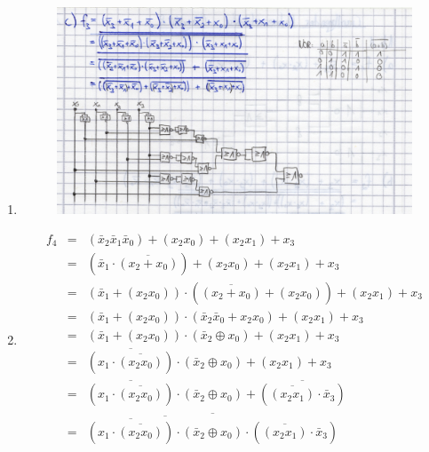 \documentclass[a4paper]{article}
\begin{document}
\begin{enumerate}[label=\alph*)]
\begin{figure}[h!]
\begin{center}
		\end{center}
	\end{figure} 
	\item 
	\begin{figure}[h!]
		\begin{center}
			\includegraphics[scale=0.3]{Aufgabe1c.png}
		\end{center}
	\end{figure} 
	\item 
	\begin{align*}
		f_4 &= &(\bar{x}_2 \bar{x}_1 \bar{x}_0) + (x_2x_0) + (x_2x_1) + x_3 \\
			&= &(\bar{x}_1 \cdot \overline{(x_2 + x_0)}) + (x_2x_0) + (x_2x_1) + x_3 \\
			&= &(\bar{x}_1 + (x_2x_0)) \cdot (\overline{(x_2 + x_0)} + (x_2x_0)) + (x_2x_1) + x_3 \\
			&= &(\bar{x}_1 + (x_2x_0)) \cdot (\bar{x}_2\bar{x}_0 + x_2x_0) + (x_2x_1) + x_3 \\
			&= &(\bar{x}_1 + (x_2x_0)) \cdot (\bar{x}_2 \oplus x_0) + (x_2x_1) + x_3 \\
			&= &\overline{(x_1 \cdot \overline{(x_2x_0)})} \cdot (\bar{x}_2 \oplus x_0) + (x_2x_1) + x_3 \\
			&= &\overline{(x_1 \cdot \overline{(x_2x_0)})} \cdot (\bar{x}_2 \oplus x_0) + \overline{(\overline{(x_2x_1)} \cdot \bar{x}_3)} \\
			&= &\overline{\overline{\overline{(x_1 \cdot \overline{(x_2x_0)})} \cdot (\bar{x}_2 \oplus x_0)} \cdot (\overline{(x_2x_1)} \cdot \bar{x}_3)} \\
	\end{align*}
	\begin{figure}[h!]
		\begin{center}

\end{center}
\end{figure}
\end{enumerate}
\end{document}
